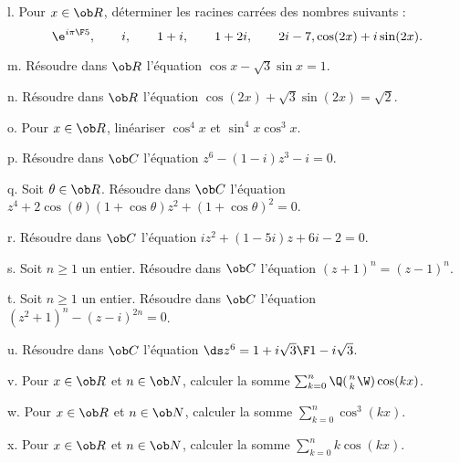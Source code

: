 \exo [Level=1,Fight=0,Learn=0,Field=\NombresComplexes,Type=\TravauxDirigés,Origin=] l. 
Pour $x\in\ob R$, déterminer les racines carrées des nombres suivants : 
$$
\e^{i\pi\F5},\qquad i,\qquad 1+i, \qquad 1+2i,\qquad2i-7,\cos(2x)+i\sin(2x). 
$$

\exo [Origin=\Lakedaemon,Level=1,Fight=1,Learn=1,Type=\Colles,Field=\Trigonométrie] m. 
Résoudre dans $\ob R$ l'équation $\cos x-\sqrt3\sin x=1$. 

\exo [Origin=\Lakedaemon,Level=1,Fight=1,Learn=1,Type=\Colles,Field=\Trigonométrie] n. 
Résoudre dans $\ob R$ l'équation $\cos(2x)+\sqrt3\sin(2x)=\sqrt2$. 

\exo [Level=1,Fight=2,Learn=1,Field=\NombresComplexes,Type=\Colles,Origin=] o. 
Pour $x\in\ob R$, linéariser $\cos^4x$ et $\sin^4x\cos^3x$. %

\exo [Level=1,Fight=1,Learn=1,Field=\NombresComplexes,Type=\Colles,Origin=] p. 
Résoudre dans $\ob C$ l'équation $z^6-(1-i)z^3-i=0$.

\exo [Level=1,Fight=1,Learn=1,Field=\NombresComplexes,Type=\Colles,Origin=] q. 
Soit $\theta\in\ob R$. Résoudre dans $\ob C$ l'équation $z^4+2\cos(\theta)(1+\cos\theta)z^2+(1+\cos\theta)^2=0$.

\exo [Level=1,Fight=0,Learn=0,Field=\NombresComplexes,Type=\Cours,Origin=] r. 
Résoudre dans $\ob C$ l'équation $iz^2+(1-5i)z+6i-2=0$. 

\exo [Level=1,Fight=1,Learn=1,Field=\NombresComplexes,Type=\Exercices,Origin=] s. 
Soit $n\ge1$ un entier. Résoudre dans $\ob C$ l'équation $(z+1)^n=(z-1)^n$. 

\exo [Level=1,Fight=1,Learn=1,Field=\NombresComplexes,Type=\Exercices,Origin=] t. 
Soit $n\ge1$ un entier. Résoudre dans $\ob C$ l'équation $(z^2+1)^n-(z-i)^{2n}=0$. 

\exo [Level=1,Fight=1,Learn=1,Field=\NombresComplexes,Type=\Colles,Origin=] u. 
Résoudre dans $\ob C$ l'équation $\ds z^6={1+i\sqrt3\F1-i\sqrt3}$. 

\exo [Level=1,Fight=1,Learn=1,Field=\NombresComplexes,Type=\Cours,Origin=] v. 
Pour $x\in\ob R$ et $n\in\ob N$, calculer la somme $\sum_{k=0}^n\Q({n\atop k}\W)\cos(kx)$. 
 
\exo [Level=1,Fight=2,Learn=2,Field=\NombresComplexes,Type=\Exercices,Origin=] w. 
Pour $x\in\ob R$ et $n\in\ob N$, calculer la somme $\sum_{k=0}^n\cos^3(kx)$. 

\exo [Level=1,Fight=3,Learn=2,Field=\NombresComplexes,Type=\Colles,Origin=\MP] x. 
Pour $x\in\ob R$ et $n\in\ob N$, calculer la somme $\sum_{k=0}^nk\cos(kx)$.

